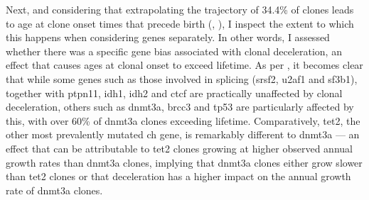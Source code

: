 \begin{figure}[!ht]
	\label{fig:expected-observed-ratio-representation}
\end{figure}

\begin{figure}[!ht]
	\label{fig:expected-observed-ratio}
\end{figure}

\begin{figure}[!ht]
	\label{fig:expected-observed-full}
\end{figure}

Next, and considering that extrapolating the trajectory of 34.4\% of clones leads to age at clone onset times that precede birth (, ), I inspect the extent to which this happens when considering genes separately. In other words, I assessed whether there was a specific gene bias associated with clonal deceleration, an effect that causes ages at clonal onset to exceed lifetime. As per , it becomes clear that while some genes such as those involved in splicing (\ac{srsf2}, \ac{u2af1} and \ac{sf3b1}), together with \ac{ptpn11}, \ac{idh1}, \ac{idh2} and \ac{ctcf} are practically unaffected by clonal deceleration, others such as \ac{dnmt3a}, \ac{brcc3} and \ac{tp53} are particularly affected by this, with over 60\% of \ac{dnmt3a} clones exceeding lifetime. Comparatively, \ac{tet2}, the other most prevalently mutated \ac{ch} gene, is remarkably different to \ac{dnmt3a} --- an effect that can be attributable to \ac{tet2} clones growing at higher observed annual growth rates than \ac{dnmt3a} clones, implying that \ac{dnmt3a} clones either grow slower than \ac{tet2} clones or that deceleration has a higher impact on the annual growth rate of \ac{dnmt3a} clones. 


